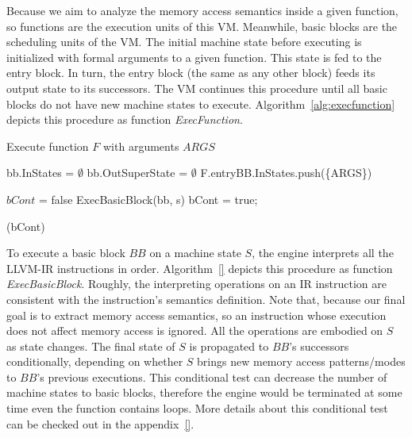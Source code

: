 Because we aim to analyze the memory access semantics inside a given function,
so functions are the execution units of this VM.
Meanwhile, basic blocks are the scheduling units of the VM.
The initial machine state before executing is initialized with formal arguments to a given function.
This state is fed to the entry block. In turn, the entry block (the same as any other block) feeds its output state to its successors.
The VM continues this procedure until all basic blocks do not have new machine states to execute.
Algorithm~\ref{alg:execfunction} depicts this procedure as function \textit{ExecFunction}.

\begin{algorithm}
  \caption{Execute function $F$ with arguments $ARGS$}
  \footnotesize
  \begin{algorithmic}[1]
     
    \State bb.InStates = {$\emptyset$} 
    \State bb.OutSuperState = {$\emptyset$} 
    \EndFor
    \State F.entryBB.InStates.push(\{ARGS\}) 
    \State

    \Do {}

    \State $bCont$ = false
    \State ExecBasicBlock(bb, s)
    \State bCont = true;
    \EndWhile
    \EndFor

    \doWhile(bCont)
    \EndFunction
  \end{algorithmic}
  \label{alg:execfunction}
\end{algorithm}

To execute a basic block $BB$ on a machine state $S$, the engine interprets all the LLVM-IR instructions in order.
Algorithm~\ref{} depicts this procedure as function \textit{ExecBasicBlock}.
Roughly, the interpreting operations on an IR instruction are consistent with the instruction's semantics definition.
Note that, because our final goal is to extract memory access semantics,
so an instruction whose execution does not affect memory access is ignored.
All the operations are embodied on $S$ as state changes.
The final state of $S$ is propagated to $BB$'s successors conditionally,
depending on whether $S$ brings new memory access patterns/modes to $BB$'s previous executions.
This conditional test can decrease the number of machine states to basic blocks,
therefore the engine would be terminated at some time even the function contains loops.
More details about this conditional test can be checked out in the appendix~\ref{}.


